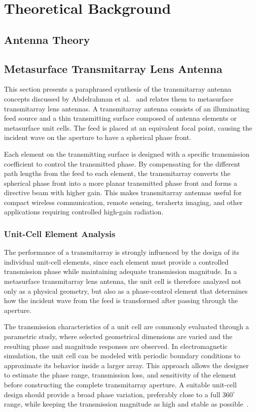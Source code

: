 \chapter{Theoretical Background}

\section{Antenna Theory}

\section{Metasurface Transmitarray Lens Antenna}
This section presents a paraphrased synthesis of the transmitarray antenna concepts discussed by Abdelrahman et al.~\cite{Abdelrahman2017} and relates them to metasurface transmitarray lens antennas. A transmitarray antenna consists of an illuminating feed source and a thin transmitting surface composed of antenna elements or metasurface unit cells. The feed is placed at an equivalent focal point, causing the incident wave on the aperture to have a spherical phase front.

Each element on the transmitting surface is designed with a specific transmission coefficient to control the transmitted phase. By compensating for the different path lengths from the feed to each element, the transmitarray converts the spherical phase front into a more planar transmitted phase front and forms a directive beam with higher gain. This makes transmitarray antennas useful for compact wireless communication, remote sensing, terahertz imaging, and other applications requiring controlled high-gain radiation.

\subsection{Unit-Cell Element Analysis}
The performance of a transmitarray is strongly influenced by the design of its individual unit-cell elements, since each element must provide a controlled transmission phase while maintaining adequate transmission magnitude. In a metasurface transmitarray lens antenna, the unit cell is therefore analyzed not only as a physical geometry, but also as a phase-control element that determines how the incident wave from the feed is transformed after passing through the aperture.

The transmission characteristics of a unit cell are commonly evaluated through a parametric study, where selected geometrical dimensions are varied and the resulting phase and magnitude responses are observed. In electromagnetic simulation, the unit cell can be modeled with periodic boundary conditions to approximate its behavior inside a larger array. This approach allows the designer to estimate the phase range, transmission loss, and sensitivity of the element before constructing the complete transmitarray aperture. A suitable unit-cell design should provide a broad phase variation, preferably close to a full $360^\circ$ range, while keeping the transmission magnitude as high and stable as possible~\cite{Abdelrahman2017}.


